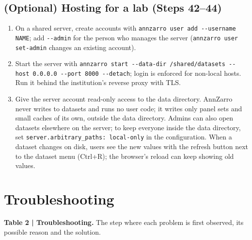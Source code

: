 \subsection{(Optional) Hosting for a lab (Steps 42--44)}

\begin{enumerate}
\def\labelenumi{\arabic{enumi}.}
\setcounter{enumi}{41}
\tightlist
\item
  On a shared server, create accounts with \passthrough{\lstinline!annzarro user add --username NAME!}; add \passthrough{\lstinline!--admin!} for the person who manages the server (\passthrough{\lstinline!annzarro user set-admin!} changes an existing account).
\item
  Start the server with \passthrough{\lstinline!annzarro start --data-dir /shared/datasets --host 0.0.0.0 --port 8000 --detach!}; login is enforced for non-local hosts. Run it behind the institution's reverse proxy with TLS.
\troubleshoot{}
\item
  Give the server account read-only access to the data directory. AnnZarro never writes to datasets and runs no user code; it writes only panel sets and small caches of its own, outside the data directory. Admins can also open datasets elsewhere on the server; to keep everyone inside the data directory, set \passthrough{\lstinline!server.arbitrary_paths: local-only!} in the configuration. When a dataset changes on disk, users see the new values with the refresh button next to the dataset menu (Ctrl+R); the browser's reload can keep showing old values.
\end{enumerate}

\section{Troubleshooting}

\noindent\textbf{Table 2 | Troubleshooting.} The step where each problem is first observed, its possible reason and the solution.

